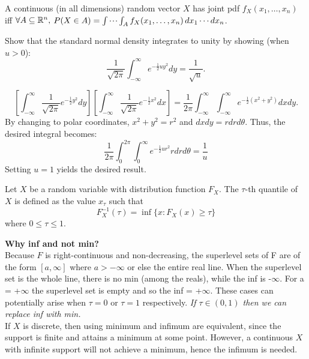 \documentclass[DIV=14,titlepage=false]{scrreprt}
\begin{document}
A continuous (in all dimensions) random vector $ X $ has joint pdf $ f_X(x_1, \dotsc, x_n) $ iff $ \forall A \subseteq \mathbb{R}^n, $ $ P(X \in A) = \idotsint_A f_X(x_1, \dotsc, x_n) \, dx_1 \dotsm dx_n $.
\vspace{5pt}
\begin{exercise}
  Show that the standard normal density integrates to unity by showing (when \( u > 0 \)):
  \[
\frac{1}{\sqrt{2\pi}} \int_{-\infty}^{\infty} e^{-\frac{1}{2}u y^2} dy = \frac{1}{\sqrt{u}}.
\]
\end{exercise}
\begin{solution}
\[\left[
\int_{-\infty}^{\infty} \frac{1}{\sqrt{2\pi}} e^{-\frac{1}{2}y^2} dy
\right]
\left[
\int_{-\infty}^{\infty} \frac{1}{\sqrt{2\pi}} e^{-\frac{1}{2}x^2} dx
\right] 
= \frac{1}{2\pi} \int_{-\infty}^{\infty} \int_{-\infty}^{\infty} e^{-\frac{1}{2}(x^2+y^2)} dxdy.
\]
By changing to polar coordinates, $x^2+y^2=r^2$ and $dxdy=rdrd\theta$. Thus, the desired integral becomes:
\[ \frac{1}{2\pi} \int_{0}^{2\pi} \int_{0}^{\infty} e^{-\frac{1}{2}ur^2} rdrd\theta = \frac{1}{u}\]
Setting $u=1$ yields the desired result.
\end{solution}
\begin{definition}
  Let \( X \) be a random variable with distribution function \( F_X \). The \(\tau\)-th quantile of \( X \) is defined as the value \( x_\tau \) such that
\[ F_X^{-1}(\tau) = \inf\{ x : F_X(x) \geq \tau \} \]
where \( 0 \leq \tau \leq 1 \).
\end{definition}
\vspace{5pt}
\textbf{Why inf and not min?}\\
Because $F$ is right-continuous and non-decreasing, the superlevel sets of F are of the form $[a,\infty]$ where $a>-\infty$ or else the entire real line. When the superlevel set is the whole line, there is no min (among the reals), while the inf is -$ \infty$. For a = +$ \infty$ the superlevel set is empty and so the inf = +$\infty$. These cases can potentially arise when $\tau=0$ or $\tau = 1$ respectively.
\textit{If $\tau \in (0,1)$ then we can replace inf with min.}\\
If $X$ is discrete, then using minimum and infimum are equivalent, since the support is finite and attains a minimum at some point. However, a continuous $X$ with infinite support will not achieve a minimum, hence the infimum is needed.
\end{document}
